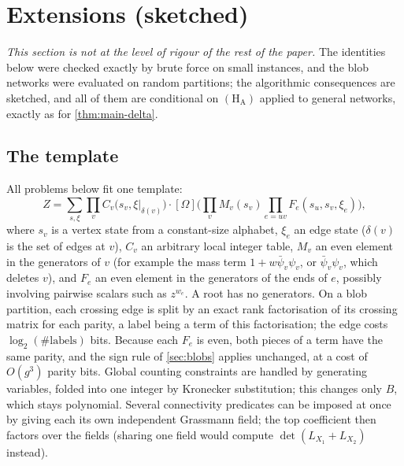\documentclass[11pt]{amsart}
\theoremstyle{plain}
\theoremstyle{definition}
\theoremstyle{remark}
\numberwithin{equation}{section}
\newcommand{\bpsi}{\bar\psi}
\newcommand{\topc}[2]{[#1]\bigl(#2\bigr)}
\begin{document}
\section{Extensions (sketched)}\label{sec:extensions}

\emph{This section is not at the level of rigour of the rest of the paper.} The identities below
were checked exactly by brute force on small instances, and the blob networks were evaluated on
random partitions; the algorithmic consequences are sketched, and all of them are conditional on
$(\mathrm{H}_{\mathrm{A}})$ applied to general networks, exactly as for \cref{thm:main-delta}.

\subsection{The template}
All problems below fit one template:
\begin{equation}\label{eq:template}
  Z=\sum_{s,\xi}\prod_vC_v\bigl(s_v,\xi|_{\delta(v)}\bigr)\cdot
  \topc{\Omega}{\prod_vM_v(s_v)\prod_{e=uv}F_e(s_u,s_v,\xi_e)} ,
\end{equation}
where $s_v$ is a vertex state from a constant-size alphabet, $\xi_e$ an edge state ($\delta(v)$ is the set of edges at $v$), $C_v$ an
arbitrary local integer table, $M_v$ an even element in the generators of $v$ (for example the
mass term $1+w\bpsi_v\psi_v$, or $\bpsi_v\psi_v$, which deletes $v$), and $F_e$ an even element in
the generators of the ends of $e$, possibly involving pairwise scalars such as $z^{w_e}$. A root
has no generators. On a blob partition, each crossing edge is split by an exact rank
factorisation of its crossing matrix for each parity, a label being a term of this
factorisation; the edge costs $\log_2(\#\text{labels})$ bits. Because each $F_e$ is even, both
pieces of a term have the same parity, and the sign rule of \cref{sec:blobs} applies unchanged,
at a cost of $O(g^3)$ parity bits. Global counting constraints are handled by generating
variables, folded into one integer by Kronecker substitution; this changes only $B$, which stays
polynomial. Several connectivity predicates can be imposed at once by giving each its own
independent Grassmann field; the top coefficient then factors over the fields (sharing one field
would compute $\det(L_{X_1}+L_{X_2})$ instead).
\end{document}
